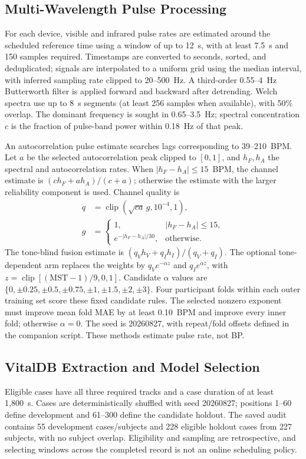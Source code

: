 \subsection{Multi-Wavelength Pulse Processing}
For each device, visible and infrared pulse rates are estimated around the scheduled reference time using a window of up to 12~s, with at least 7.5~s and 150 samples required. Timestamps are converted to seconds, sorted, and deduplicated; signals are interpolated to a uniform grid using the median interval, with inferred sampling rate clipped to 20--500~Hz. A third-order 0.55--4~Hz Butterworth filter is applied forward and backward after detrending. Welch spectra use up to 8~s segments (at least 256 samples when available), with 50\% overlap. The dominant frequency is sought in 0.65--3.5~Hz; spectral concentration $c$ is the fraction of pulse-band power within 0.18~Hz of that peak.

An autocorrelation pulse estimate searches lags corresponding to 39--210~BPM. Let $a$ be the selected autocorrelation peak clipped to $[0,1]$, and $h_F,h_A$ the spectral and autocorrelation rates. When $|h_F-h_A|\leq15$~BPM, the channel estimate is $(c h_F+a h_A)/(c+a)$; otherwise the estimate with the larger reliability component is used. Channel quality is
\begin{align}
q&=\operatorname{clip}\!\left(\sqrt{ca}\,g,10^{-4},1\right),\\
g&=\begin{cases}1,&|h_F-h_A|\leq15,\\
e^{-|h_F-h_A|/30},&\text{otherwise.}\end{cases}
\end{align}
The tone-blind fusion estimate is $(q_Vh_V+q_Ih_I)/(q_V+q_I)$. The optional tone-dependent arm replaces the weights by $q_Ve^{-\alpha z}$ and $q_Ie^{\alpha z}$, with $z=\operatorname{clip}[(\mathrm{MST}-1)/9,0,1]$. Candidate $\alpha$ values are $\{0,\pm0.25,\pm0.5,\pm0.75,\pm1,\pm1.5,\pm2,\pm3\}$. Four participant folds within each outer training set score these fixed candidate rules. The selected nonzero exponent must improve mean fold MAE by at least 0.10~BPM and improve every inner fold; otherwise $\alpha=0$. The seed is 20260827, with repeat/fold offsets defined in the companion script. These methods estimate pulse rate, not BP.

\subsection{VitalDB Extraction and Model Selection}
Eligible cases have all three required tracks and a case duration of at least 1,800~s. Cases are deterministically shuffled with seed 20260827; positions 1--60 define development and 61--300 define the candidate holdout. The saved audit contains 55 development cases/subjects and 228 eligible holdout cases from 227 subjects, with no subject overlap. Eligibility and sampling are retrospective, and selecting windows across the completed record is not an online scheduling policy.

